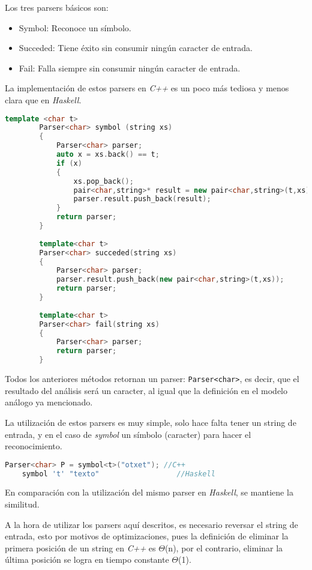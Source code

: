 	Los tres parsers básicos son:
	\begin{itemize}
		\item Symbol: Reconoce un símbolo.
		\item Succeded: Tiene éxito sin consumir ningún caracter de entrada.
		\item Fail: Falla siempre sin consumir ningún caracter de entrada.
	\end{itemize}
	
	La implementación de estos parsers en \emph{C++} es un poco más tediosa y menos clara que en \emph{Haskell}.
	
	\begin{lstlisting}[language=C++, caption=Parsers básicos]
		template <char t>
		Parser<char> symbol (string xs)
		{
			Parser<char> parser;
			auto x = xs.back() == t;
			if (x)
			{
				xs.pop_back();
				pair<char,string>* result = new pair<char,string>(t,xs);
				parser.result.push_back(result);
			}			
			return parser;
		}
		
		template<char t>
		Parser<char> succeded(string xs)
		{
			Parser<char> parser;
			parser.result.push_back(new pair<char,string>(t,xs));
			return parser;
		}
		
		template<char t>
		Parser<char> fail(string xs)
		{
			Parser<char> parser;
			return parser;
		}		
	\end{lstlisting}
	
	Todos los anteriores métodos retornan un parser: \texttt{Parser<char>}, es decir, que el resultado del análisis será un caracter, al igual que la definición en el modelo análogo ya mencionado.
	
	La utilización de estos parsers es muy simple, solo hace falta tener un string de entrada, y en el caso de \emph{symbol} un símbolo (caracter) para hacer el reconocimiento.
	
	\begin{lstlisting}[language=C++]
	Parser<char> P = symbol<t>("otxet"); //C++
	symbol 't' "texto"					//Haskell
	\end{lstlisting}
	En comparación con la utilización del mismo parser en \emph{Haskell}, se mantiene la similitud.
	
	A la hora de utilizar los parsers aquí descritos, es necesario reversar el string de entrada, esto por motivos de optimizaciones, pues la definición de eliminar la primera posición de un string en \emph{C++} es $\Theta$(n), por el contrario, eliminar la última posición se logra en tiempo constante $\Theta$(1).
	
